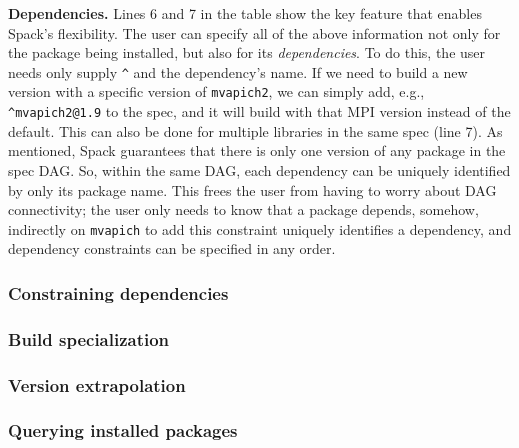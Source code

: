 {\bf Dependencies.}
Lines 6 and 7 in the table show the key feature that enables Spack's flexibility.
The user can specify all of the above information not only for the package being
installed, but also for its {\it dependencies}.  To do this, the user needs only supply 
\verb|^| and the dependency's name.  If we need to build a new version with a specific
version of {\tt mvapich2}, we can simply add, e.g., \verb|^mvapich2@1.9|
to the spec, and it will build with that MPI version instead of the default.
This can also be done for multiple libraries in the same spec (line 7).  
As mentioned, Spack guarantees that there is only one version of any package in 
the spec DAG.  So, within the same DAG, each dependency can be uniquely identified by 
only its package name.  This frees the user from having to worry about DAG connectivity;
the user only needs to know that a package depends, somehow, indirectly on {\tt mvapich}
to add this constraint
uniquely identifies a dependency, and dependency constraints can be specified in any
order.  


\subsubsection{Constraining dependencies}


\subsubsection{Build specialization}


\subsubsection{Version extrapolation}


\subsubsection{Querying installed packages}




